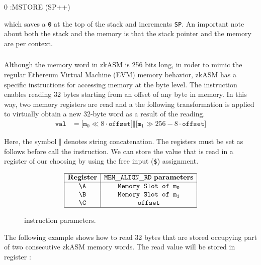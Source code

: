 \begin{zkasm}
0		:MSTORE (SP++)
\end{zkasm}

which saves a \texttt{0} at the top of the stack and increments \texttt{SP}. An important note about both the stack and the memory is that the stack pointer and the memory are per context.




\subsubsection{\MEMALIGNRD}

Although the memory word in zkASM is 256 bits long, in roder to mimic the regular Ethereum Virtual Machine (EVM) memory behavior, zkASM has a specific instructions for accessing memory at the byte level. The instruction \MEMALIGNRD enables reading 32 bytes starting from an offset of any byte in memory. In this way, two memory registers are read and a the following transformation is applied to virtually obtain a new 32-byte word as a result of the reading.
\begin{align*}
    \texttt{val} &= \Bigr[ \texttt{m}_0 \ll 8 \cdot \texttt{offset} \Bigr] \mathbin\Vert \Bigr[ \texttt{m}_1 \gg 256- 8 \cdot \texttt{offset} \Bigr] 
\end{align*}

Here, the symbol $\mathbin\Vert$ denotes string concatenation. The registers must be set as follows before call the \MEMALIGNRD instruction. We can store the value that is read in a register of our choosing by using the free input (\texttt{\$}) assignment.


\begin{figure}[h!]
    \renewcommand{\figurename}{Table}
    \[
    \begin{array}{|c|c|}
        \hline
        \mathbf{Register} &\mathtt{MEM\_ALIGN\_RD} \ \mathbf{parameters} \\ \hline
        \A & \texttt{Memory Slot of } \mathtt{m_0} \\
        \B & \texttt{Memory Slot of } \mathtt{m_1} \\
        \C & \texttt{offset} \\
        \hline
    \end{array}
    \]
    \caption{\MEMALIGNRD instruction parameters.}
    \label{tab:memory-first-example}
\end{figure}

The following example shows how to read 32 bytes that are stored occupying part of two consecutive zkASM memory words. The read value will be stored in register \A:

